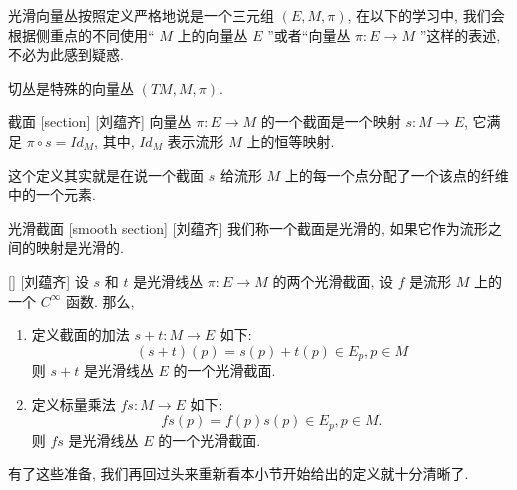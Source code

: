 \documentclass[UTF8]{ctexart}
\begin{document}
        \begin{rmk}
            []
            光滑向量丛按照定义严格地说是一个三元组 \((E,M,\pi)\), 在以下的学习中, 我们会根据侧重点的不同使用“ \(M\) 上的向量丛 \(E\) ”或者“向量丛 \(\pi: E \rightarrow M\) ”这样的表述, 不必为此感到疑惑. 
        \end{rmk}

        \begin{rmk}
            []
            切丛是特殊的向量丛 \((TM, M, \pi)\). 
        \end{rmk}

        \begin{dfn}
            []
            {截面}
            [section]
            [刘蕴齐]
            向量丛 \(\pi: E \rightarrow M\) 的一个截面是一个映射 \(s: M \rightarrow E\), 它满足 \(\pi \circ s = Id_{M}\), 其中,  \(Id_{M}\) 表示流形 \(M\) 上的恒等映射. 
        \end{dfn}

        \begin{rmk}
            []
            这个定义其实就是在说一个截面 \(s\) 给流形 \(M\) 上的每一个点分配了一个该点的纤维中的一个元素. 
        \end{rmk}

        \begin{dfn}
            []
            {光滑截面}
            [smooth section]
            [刘蕴齐]
            我们称一个截面是光滑的, 如果它作为流形之间的映射是光滑的. 
        \end{dfn}

        \begin{ppt}
            []
            {}
            []
            [刘蕴齐]
            设 \(s\) 和 \(t\) 是光滑线丛 \(\pi: E \rightarrow M\) 的两个光滑截面, 设 \(f\) 是流形 \(M\) 上的一个 \(C^{\infty}\) 函数. 那么,
            \begin{enumerate}
                \item 定义截面的加法 \(s + t: M \rightarrow E\) 如下:
                \[
                    (s + t)(p) = s(p) + t(p) \in E_p, p \in M
                \]
                则 \(s + t\) 是光滑线丛 \(E\) 的一个光滑截面. 
                \item 定义标量乘法 \(f s: M \rightarrow E\) 如下:
                \[
                    fs(p) = f(p)s(p) \in E_p, p \in M.
                \]
                则 \(f s\) 是光滑线丛 \(E\) 的一个光滑截面. 
            \end{enumerate}
        \end{ppt}
        有了这些准备, 我们再回过头来重新看本小节开始给出的定义就十分清晰了. 
\end{document}
